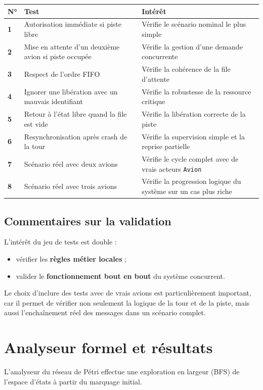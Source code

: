 \documentclass[11pt,a4paper]{article}
\begin{document}
\begin{longtable}{>{\bfseries}p{0.9cm} p{5.4cm} p{8.1cm}}
\toprule
N° & Test & Intérêt \\
\midrule
1 & Autorisation immédiate si piste libre & Vérifie le scénario nominal le plus simple \\
2 & Mise en attente d'un deuxième avion si piste occupée & Vérifie la gestion d'une demande concurrente \\
3 & Respect de l'ordre FIFO & Vérifie la cohérence de la file d'attente \\
4 & Ignorer une libération avec un mauvais identifiant & Vérifie la robustesse de la ressource critique \\
5 & Retour à l'état libre quand la file est vide & Vérifie la libération correcte de la piste \\
6 & Resynchronisation après crash de la tour & Vérifie la supervision simple et la reprise partielle \\
7 & Scénario réel avec deux avions & Vérifie le cycle complet avec de vrais acteurs \texttt{Avion} \\
8 & Scénario réel avec trois avions & Vérifie la progression logique du système sur un cas plus riche \\
\bottomrule
\end{longtable}

\subsection{Commentaires sur la validation}

L'intérêt du jeu de tests est double :
\begin{itemize}
    \item vérifier les \textbf{règles métier locales} ;
    \item valider le \textbf{fonctionnement bout en bout} du système concurrent.
\end{itemize}

Le choix d'inclure des tests avec de vrais avions est particulièrement important, car il permet de vérifier non seulement la logique de la tour et de la piste, mais aussi l'enchaînement réel des messages dans un scénario complet.

\section{Analyseur formel et résultats}

L'analyseur du réseau de Pétri effectue une exploration en largeur (BFS) de l'espace d'états à partir du marquage initial.
\end{document}
